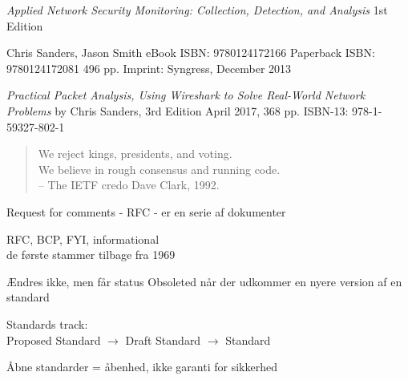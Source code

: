 \documentclass[Screen16to9,17pt]{foils}
\begin{document}


\emph{Applied Network Security Monitoring: Collection, Detection, and Analysis}
1st Edition

Chris Sanders, Jason Smith
eBook ISBN: 9780124172166
Paperback ISBN: 9780124172081 496 pp.
Imprint: Syngress, December 2013

{\footnotesize{}}


\emph{Practical Packet Analysis,
Using Wireshark to Solve Real-World Network Problems}
by Chris Sanders, 3rd Edition
April 2017, 368 pp.
ISBN-13:
978-1-59327-802-1




\begin{quote}
We reject kings, presidents, and voting.\\
We believe in rough consensus and running code.\\
-- The IETF credo Dave Clark, 1992.
\end{quote}

\begin{list1}
\item Request for comments - RFC - er en serie af dokumenter
\item RFC, BCP, FYI, informational\\
de første stammer tilbage fra 1969
\item Ændres ikke, men får status Obsoleted når der udkommer en nyere
  version af en standard
\item Standards track:\\
Proposed Standard $\rightarrow$ Draft Standard $\rightarrow$ Standard
\item  Åbne standarder = åbenhed, ikke garanti for sikkerhed
\end{list1}




\end{document}
